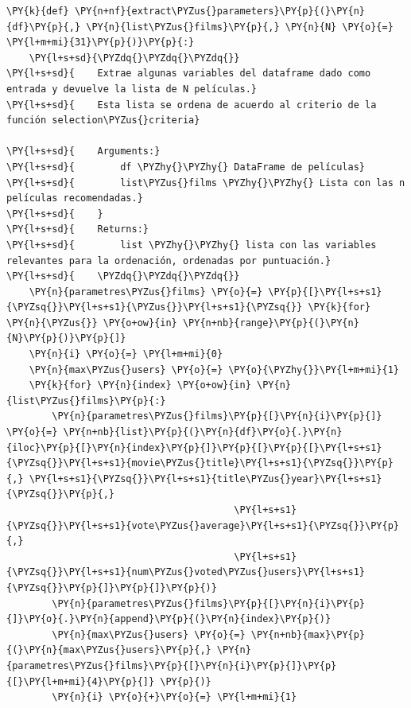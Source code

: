     \begin{tcolorbox}[breakable, size=fbox, boxrule=1pt, pad at break*=1mm,colback=cellbackground, colframe=cellborder]
\begin{Verbatim}[commandchars=\\\{\}]
\PY{k}{def} \PY{n+nf}{extract\PYZus{}parameters}\PY{p}{(}\PY{n}{df}\PY{p}{,} \PY{n}{list\PYZus{}films}\PY{p}{,} \PY{n}{N} \PY{o}{=} \PY{l+m+mi}{31}\PY{p}{)}\PY{p}{:}
    \PY{l+s+sd}{\PYZdq{}\PYZdq{}\PYZdq{}}
\PY{l+s+sd}{    Extrae algunas variables del dataframe dado como entrada y devuelve la lista de N películas.}
\PY{l+s+sd}{    Esta lista se ordena de acuerdo al criterio de la función selection\PYZus{}criteria}

\PY{l+s+sd}{    Arguments:}
\PY{l+s+sd}{        df \PYZhy{}\PYZhy{} DataFrame de películas}
\PY{l+s+sd}{        list\PYZus{}films \PYZhy{}\PYZhy{} Lista con las n películas recomendadas.}
\PY{l+s+sd}{    }
\PY{l+s+sd}{    Returns:}
\PY{l+s+sd}{        list \PYZhy{}\PYZhy{} lista con las variables relevantes para la ordenación, ordenadas por puntuación.}
\PY{l+s+sd}{    \PYZdq{}\PYZdq{}\PYZdq{}}
    \PY{n}{parametres\PYZus{}films} \PY{o}{=} \PY{p}{[}\PY{l+s+s1}{\PYZsq{}}\PY{l+s+s1}{\PYZus{}}\PY{l+s+s1}{\PYZsq{}} \PY{k}{for} \PY{n}{\PYZus{}} \PY{o+ow}{in} \PY{n+nb}{range}\PY{p}{(}\PY{n}{N}\PY{p}{)}\PY{p}{]}
    \PY{n}{i} \PY{o}{=} \PY{l+m+mi}{0}
    \PY{n}{max\PYZus{}users} \PY{o}{=} \PY{o}{\PYZhy{}}\PY{l+m+mi}{1}
    \PY{k}{for} \PY{n}{index} \PY{o+ow}{in} \PY{n}{list\PYZus{}films}\PY{p}{:}
        \PY{n}{parametres\PYZus{}films}\PY{p}{[}\PY{n}{i}\PY{p}{]} \PY{o}{=} \PY{n+nb}{list}\PY{p}{(}\PY{n}{df}\PY{o}{.}\PY{n}{iloc}\PY{p}{[}\PY{n}{index}\PY{p}{]}\PY{p}{[}\PY{p}{[}\PY{l+s+s1}{\PYZsq{}}\PY{l+s+s1}{movie\PYZus{}title}\PY{l+s+s1}{\PYZsq{}}\PY{p}{,} \PY{l+s+s1}{\PYZsq{}}\PY{l+s+s1}{title\PYZus{}year}\PY{l+s+s1}{\PYZsq{}}\PY{p}{,}
                                        \PY{l+s+s1}{\PYZsq{}}\PY{l+s+s1}{vote\PYZus{}average}\PY{l+s+s1}{\PYZsq{}}\PY{p}{,} 
                                        \PY{l+s+s1}{\PYZsq{}}\PY{l+s+s1}{num\PYZus{}voted\PYZus{}users}\PY{l+s+s1}{\PYZsq{}}\PY{p}{]}\PY{p}{]}\PY{p}{)}
        \PY{n}{parametres\PYZus{}films}\PY{p}{[}\PY{n}{i}\PY{p}{]}\PY{o}{.}\PY{n}{append}\PY{p}{(}\PY{n}{index}\PY{p}{)}
        \PY{n}{max\PYZus{}users} \PY{o}{=} \PY{n+nb}{max}\PY{p}{(}\PY{n}{max\PYZus{}users}\PY{p}{,} \PY{n}{parametres\PYZus{}films}\PY{p}{[}\PY{n}{i}\PY{p}{]}\PY{p}{[}\PY{l+m+mi}{4}\PY{p}{]} \PY{p}{)}
        \PY{n}{i} \PY{o}{+}\PY{o}{=} \PY{l+m+mi}{1}

\end{Verbatim}
\end{tcolorbox}
